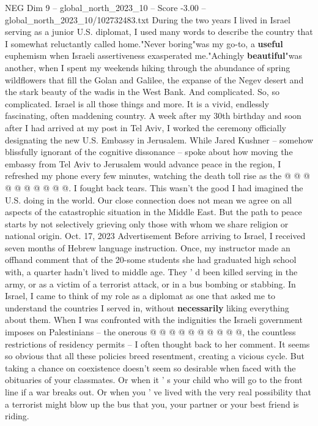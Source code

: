 \begin{textsample}{NEG Dim 9 – global\_north\_2023\_10 – Score -3.00 – global\_north\_2023\_10/102732483.txt}  \label{ex:f9_neg_147}
During the two years I lived in Israel serving as a junior U.S. diplomat, I used many words to describe the country that I somewhat reluctantly called home."Never boring"was my go-to, a \textbf{useful} euphemism when Israeli assertiveness exasperated me."Achingly \textbf{beautiful}"was another, when I spent my weekends hiking through the abundance of spring wildflowers that fill the Golan and Galilee, the expanse of the Negev desert and the stark beauty of the wadis in the West Bank.
And complicated.
So, so complicated.
Israel is all those things and more.
It is a vivid, endlessly fascinating, often maddening country.
A week after my 30th birthday and soon after I had arrived at my post in Tel Aviv, I worked the ceremony officially designating the new U.S.
Embassy in Jerusalem.
While Jared Kushner -- somehow blissfully ignorant of the cognitive dissonance -- spoke about how moving the embassy from Tel Aviv to Jerusalem would advance peace in the region, I refreshed my phone every few minutes, watching the death toll rise as the @ @ @ @ @ @ @ @ @ @.
I fought back tears.
This wasn't the good I had imagined the U.S. doing in the world.
Our close connection does not mean we agree on all aspects of the catastrophic situation in the Middle East.
But the path to peace starts by not selectively grieving only those with whom we share religion or national origin.
Oct. 17, 2023 Advertisement Before arriving to Israel, I received seven months of Hebrew language instruction.
Once, my instructor made an offhand comment that of the 20-some students she had graduated high school with, a quarter hadn't lived to middle age.
They ' d been killed serving in the army, or as a victim of a terrorist attack, or in a bus bombing or stabbing.
In Israel, I came to think of my role as a diplomat as one that asked me to understand the countries I served in, without \textbf{necessarily} liking everything about them.
When I was confronted with the indignities the Israeli government imposes on Palestinians -- the onerous @ @ @ @ @ @ @ @ @ @, the countless restrictions of residency permits -- I often thought back to her comment.
It seems so obvious that all these policies breed resentment, creating a vicious cycle.
But taking a chance on coexistence doesn't seem so desirable when faced with the obituaries of your classmates.
Or when it ' s your child who will go to the front line if a war breaks out.
Or when you ' ve lived with the very real possibility that a terrorist might blow up the bus that you, your partner or your best friend is riding.

\end{textsample}
